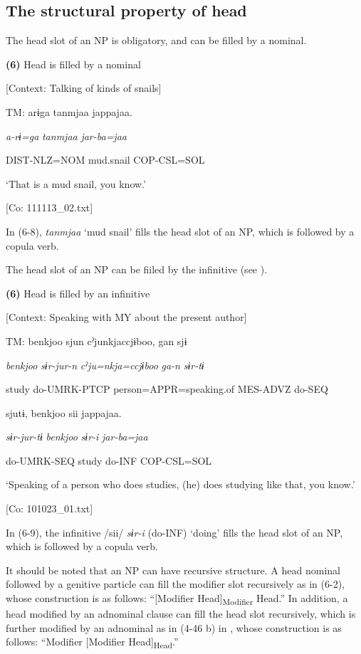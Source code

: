 \subsection{The structural property of head}

The head slot of an NP is obligatory, and can be filled by a nominal.

\textbf{(6)}  Head is filled by a nominal

  [Context: Talking of kinds of snails]

  TM:  arɨga  tanmjaa  jappajaa.

    \textit{a-rɨ=ga}  \textit{tanmjaa}  \textit{jar-ba=jaa}

    DIST-NLZ=NOM  mud.snail  COP-CSL=SOL

    ‘That is a mud snail, you know.’

    [Co: 111113\_02.txt]

In (6-8), \textit{tanmjaa} ‘mud snail’ fills the head slot of an NP, which is followed by a copula verb.

The head slot of an NP can be fiiled by the infinitive (see ).

\textbf{(6)}  Head is filled by an infinitive

  [Context: Speaking with MY about the present author]

  TM:  {\textbar}benkjoo{\textbar}  sjun  cˀjunkjaccjɨboo,  gan  sjɨ

    \textit{benkjoo}  \textit{sɨr-jur-n}  \textit{cˀju=nkja=ccjɨboo}  \textit{ga-n}  \textit{sɨr-tɨ}

    study  do-UMRK-PTCP  person=APPR=speaking.of  MES-ADVZ  do-SEQ

    sjutɨ,  {\textbar}benkjoo{\textbar}  sii  jappajaa.

    \textit{sɨr-jur-tɨ}  \textit{benkjoo}  \textit{sɨr-i}  \textit{jar-ba=jaa}

    do-UMRK-SEQ  study  do-INF  COP-CSL=SOL

    ‘Speaking of a person who does studies, (he) does studying like that, you know.’

    [Co: 101023\_01.txt]

In (6-9), the infinitive /sii/ \textit{sɨr-i} (do-INF) ‘doing’ fills the head slot of an NP, which is followed by a copula verb.

It should be noted that an NP can have recursive structure. A head nominal followed by a genitive particle can fill the modifier slot recursively as in (6-2), whose construction is as follows: “[Modifier Head]\textsubscript{Modifier} Head.” In addition, a head modified by an adnominal clause can fill the head slot recursively, which is further modified by an adnominal as in (4-46 b) in , whose construction is as follows: “Modifier [Modifier Head]\textsubscript{Head}.”

